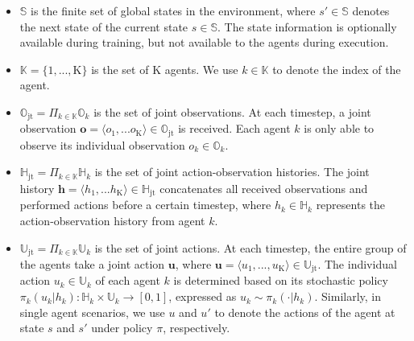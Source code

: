 \documentclass{article}
\newcommand{\statespace}{\mathbb{S}}
\newcommand{\state}{s}
\newcommand{\jointactionspace}{\mathbb{U}}
\newcommand{\jointaction}{\mathbf{u}}
\newcommand{\action}{u}
\newcommand{\jointobservationspace}{\mathbb{O}}
\newcommand{\jointobservation}{\mathbf{o}}
\newcommand{\observation}{o}
\newcommand{\jointobservationhistoryspace}{\mathbb{H}}
\newcommand{\jointobservationhistory}{\mathbf{h}}
\newcommand{\observationhistory}{h}
\newcommand{\agentspace}{\mathbb{K}}
\newcommand{\agentcounter}{k}
\newcommand{\numberofagents}{\mathrm{K}}
\newcommand{\policy}{\pi}
\newcommand{\joint}{\mathrm{jt}}
\begin{document}
\begin{itemize}
\setlength\itemsep{0em}

\item $\statespace{}$ is the finite set of global states in the environment, where $\state{}'\in \statespace{}$ denotes the next state of the current state $\state{}\in \statespace{}$. The state information is optionally available during training, but not available to the agents during execution.

\item $\agentspace{}=\{1,...,\numberofagents{}\}$ is the set of $\numberofagents{}$ agents. We use $\agentcounter{}\in\agentspace{}$ to denote the index of the agent.

\item $\jointobservationspace_{\joint}=\Pi_{\agentcounter{}\in\agentspace{}}\jointobservationspace{}_{\agentcounter{}}$ is the set of joint observations. At each timestep, a joint observation $\jointobservation{}=\langle\observation{}_1,...\observation{}_\numberofagents{}\rangle\in\jointobservationspace_{\joint}$ is received. Each agent $\agentcounter{}$ is only able to observe its individual observation $\observation{}_{\agentcounter{}}\in\jointobservationspace{}_{\agentcounter{}}$.

\item $\jointobservationhistoryspace_{\joint}=\Pi_{\agentcounter{}\in\agentspace{}}\jointobservationhistoryspace{}_{\agentcounter{}}$ is the set of joint action-observation histories. The joint history $\jointobservationhistory{}=\langle\observationhistory{}_1,...\observationhistory{}_\numberofagents{}\rangle\in\jointobservationhistoryspace_{\joint}$ concatenates all received observations and performed actions before a certain timestep, where $\observationhistory{}_{\agentcounter{}}\in\jointobservationhistoryspace{}_{\agentcounter{}}$ represents the action-observation history from agent $\agentcounter{}$.

\item $\jointactionspace_{\joint}=\Pi_{\agentcounter{}\in\agentspace{}}\jointactionspace{}_{\agentcounter{}}$ is the set of joint actions. At each timestep, the entire group of the agents take a joint action $\jointaction{}$, where $\jointaction{}=\langle\action{}_1,...,\action{}_{\numberofagents{}}\rangle\in\jointactionspace_{\joint}$. The individual action $\action{}_{\agentcounter{}}\in\jointactionspace_{\agentcounter{}}$ of each agent $\agentcounter{}$ is determined based on its stochastic policy $\policy{}_{\agentcounter{}}(\action{}_{\agentcounter{}}|\observationhistory{}_{\agentcounter{}}): \jointobservationhistoryspace{}_{\agentcounter{}}\times \jointactionspace{}_{\agentcounter{}}\rightarrow[0,1]$, expressed as $\action{}_{\agentcounter{}}\sim\policy{}_{\agentcounter{}}(\cdot|\observationhistory{}_{\agentcounter{}})$. Similarly, in single agent scenarios, we use $\action$ and $\action'$ to denote the actions of the agent at state $\state$ and $\state'$ under policy $\policy$, respectively.


\end{itemize}
\end{document}
